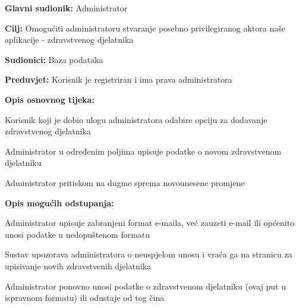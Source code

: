 					\noindent {}
					\begin{packed_item}
						
						\item \textbf{Glavni sudionik: }Administrator
						\item  \textbf{Cilj:} Omogućiti administratoru stvaranje posebno privilegiranog aktora naše aplikacije - zdravstvenog djelatnika
						\item  \textbf{Sudionici:} Baza podataka
						\item  \textbf{Preduvjet:} Korisnik je registriran i ima prava administratora
						\item  \textbf{Opis osnovnog tijeka:}
						
						\item[] \begin{packed_enum}
							
							\item Korisnik koji je dobio ulogu administratora odabire opciju za dodavanje zdravstvenog djelatnika
							\item Administrator u određenim poljima upisuje podatke o novom zdravstvenom djelatniku
							\item Administrator pritiskom na dugme sprema novounesene promjene
						\end{packed_enum}
						
						\item  \textbf{Opis mogućih odstupanja:}
						
						\item[] \begin{packed_item}
							
							\item[2.a] Administrator upisuje zabranjeni format e-maila, već zauzeti e-mail ili općenito unosi podatke u nedopuštenom formatu
							\item[] \begin{packed_enum}
								
								\item Sustav upozorava administratora o neuspjelom unosu i vraća ga na stranicu za upisivanje novih zdravstvenih djelatnika
								\item Administrator ponovno unosi podatke o zdravstvenom djelatniku (ovaj put u ispravnom formatu) ili odustaje od tog čina
								
							\end{packed_enum}
							
						\end{packed_item}
						
					\end{packed_item}
					
